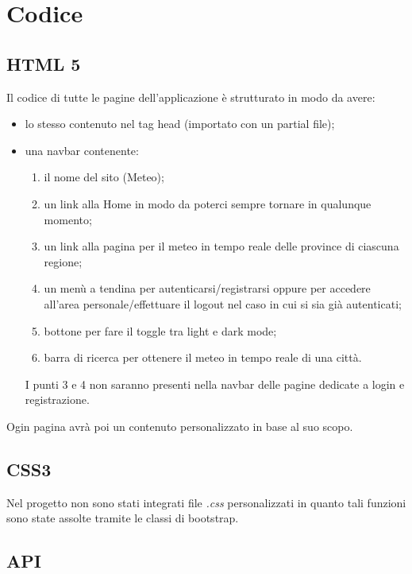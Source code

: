 \chapter{Codice}

\section{HTML 5}

Il codice di tutte le pagine dell'applicazione è strutturato in modo da avere: 
\begin{itemize}
    \item lo stesso contenuto nel tag head (importato con un partial file);
    \item una navbar contenente:
    \begin{enumerate}
        \item il nome del sito (Meteo);
        \item un link alla Home in modo da poterci sempre tornare in qualunque momento;
        \item un link alla pagina per il meteo in tempo reale delle province di ciascuna regione;
        \item un menù a tendina per autenticarsi/registrarsi oppure per accedere all'area personale/effettuare 
        il logout nel caso in cui si sia già autenticati;
        \item bottone per fare il toggle tra light e dark mode;
        \item barra di ricerca per ottenere il meteo in tempo reale di una città.
    \end{enumerate}
    I punti 3 e 4 non saranno presenti nella navbar delle pagine dedicate a login e registrazione. 
\end{itemize}

\vspace{5mm}

Ogin pagina avrà poi un contenuto personalizzato in base al suo scopo.

\section{CSS3}

Nel progetto non sono stati integrati file \emph{.css} personalizzati in quanto tali funzioni sono state assolte tramite le classi 
di bootstrap.

\section{API}

